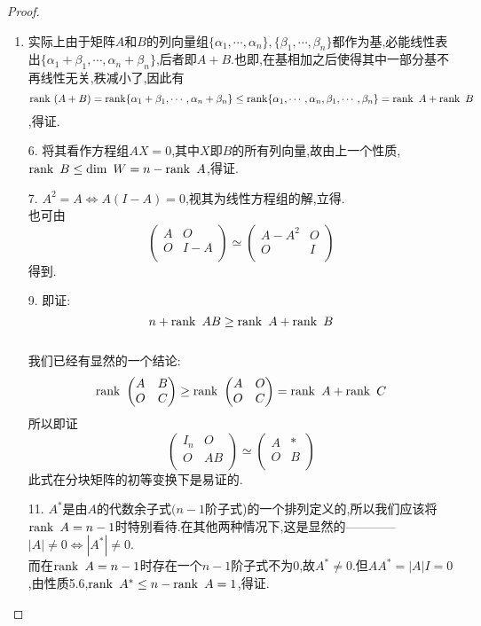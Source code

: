 \documentclass[UTF8,a4paper,notitlepage]{book}
\begin{document}
        \begin{proof}\mbox{}\begin{enumerate}%
                \item 实际上由于矩阵$A$和$B$的列向量组$\{\alpha_1,\cdots,\alpha_n\},\{\beta_1,\cdots,\beta_n\}$都作为基,必能线性表出$\{\alpha_1+\beta_1,\cdots,\alpha_n+\beta_n\}$,后者即$A+B$.也即,在基相加之后使得其中一部分基不再线性无关,秩减小了,因此有$$\operatorname{rank}~(A+B)=\operatorname{rank}\{\alpha_1+\beta_1,\cdots,\alpha_n+\beta_n\}\leq \operatorname{rank}\{\alpha_1,\cdots,\alpha_n,\beta_1,\cdots,\beta_n\}=\operatorname{rank}~A+\operatorname{rank}~B$$,得证.
                \item[6.] 将其看作方程组$AX=0$,其中$X$即$B$的所有列向量,故由上一个性质,$\operatorname{rank}~B\leq \dim~W=n-\operatorname{rank}~A$,得证.
                \item[7.] $A^2=A\Leftrightarrow A(I-A)=0$,视其为线性方程组的解,立得.\\ 也可由$$\begin{pmatrix}A&O\\ O&I-A\\ \end{pmatrix}\simeq \begin{pmatrix}A-A^2&O\\ O&I\\ \end{pmatrix}$$得到.
                \item[9.] 即证:$$n+\operatorname{rank}~AB\geq \operatorname{rank}~A+\operatorname{rank}~B$$\\ 
                    我们已经有显然的一个结论:$$\operatorname{rank}~\begin{pmatrix}A&B\\ O&C\\\end{pmatrix}\geq \operatorname{rank}~\begin{pmatrix}A&O\\ O&C\\\end{pmatrix}=\operatorname{rank}~A+\operatorname{rank}~C$$ 
                    所以即证$$\begin{pmatrix}I_n&O\\ O&AB\\ \end{pmatrix}\simeq \begin{pmatrix}A&*\\ O&B\\ \end{pmatrix}$$
                    此式在分块矩阵的初等变换下是易证的.
                \item[11.] $A^*$是由$A$的代数余子式$(n-1$阶子式)的一个排列定义的,所以我们应该将$\operatorname{rank}~A=n-1$时特别看待.在其他两种情况下,这是显然的————$|A|\neq 0\Leftrightarrow |A^*|\neq 0$.\\ 而在$\operatorname{rank}~A=n-1$时存在一个$n-1$阶子式不为0,故$A^*\neq 0$.但$AA^*=|A|I=0$,由性质5.6,$\operatorname{rank}~A^*\leq n-\operatorname{rank}~A=1$,得证.
        \end{enumerate}\end{proof}
        
\end{document}

